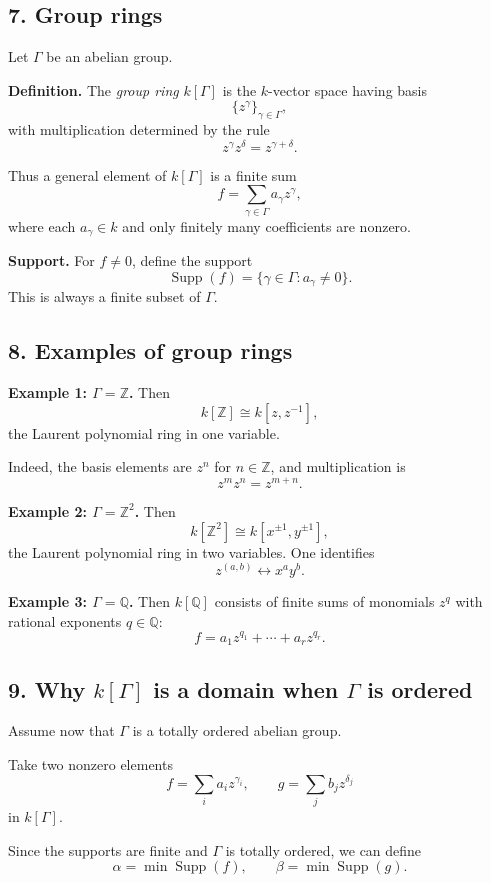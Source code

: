 \documentclass[12pt,a4paper]{article}
\theoremstyle{notespace}
\DeclareMathOperator{\Supp}{Supp}
\begin{document}
\subsection{7. Group rings}

Let \(\Gamma\) be an abelian group.

\textbf{Definition.}
The \emph{group ring} \(k[\Gamma]\) is the \(k\)-vector space having basis
\[
\{z^\gamma\}_{\gamma\in\Gamma},
\]
with multiplication determined by the rule
\[
z^\gamma z^\delta = z^{\gamma+\delta}.
\]

Thus a general element of \(k[\Gamma]\) is a finite sum
\[
f=\sum_{\gamma\in\Gamma} a_\gamma z^\gamma,
\]
where each \(a_\gamma\in k\) and only finitely many coefficients are nonzero.

\textbf{Support.}
For \(f\neq 0\), define the support
\[
\Supp(f)=\{\gamma\in\Gamma : a_\gamma\neq 0\}.
\]
This is always a finite subset of \(\Gamma\).

\subsection{8. Examples of group rings}

\textbf{Example 1: \(\Gamma=\mathbb Z\).}
Then
\[
k[\mathbb Z]\cong k[z,z^{-1}],
\]
the Laurent polynomial ring in one variable.

Indeed, the basis elements are \(z^n\) for \(n\in\mathbb Z\), and multiplication is
\[
z^m z^n = z^{m+n}.
\]

\textbf{Example 2: \(\Gamma=\mathbb Z^2\).}
Then
\[
k[\mathbb Z^2]\cong k[x^{\pm1},y^{\pm1}],
\]
the Laurent polynomial ring in two variables. One identifies
\[
z^{(a,b)} \leftrightarrow x^a y^b.
\]

\textbf{Example 3: \(\Gamma=\mathbb Q\).}
Then \(k[\mathbb Q]\) consists of finite sums of monomials \(z^q\) with rational exponents \(q\in\mathbb Q\):
\[
f = a_1 z^{q_1} + \cdots + a_r z^{q_r}.
\]

\subsection{9. Why \(k[\Gamma]\) is a domain when \(\Gamma\) is ordered}

Assume now that \(\Gamma\) is a totally ordered abelian group.

Take two nonzero elements
\[
f=\sum_i a_i z^{\gamma_i},
\qquad
g=\sum_j b_j z^{\delta_j}
\]
in \(k[\Gamma]\).

Since the supports are finite and \(\Gamma\) is totally ordered, we can define
\[
\alpha=\min \Supp(f),
\qquad
\beta=\min \Supp(g).
\]
\end{document}
